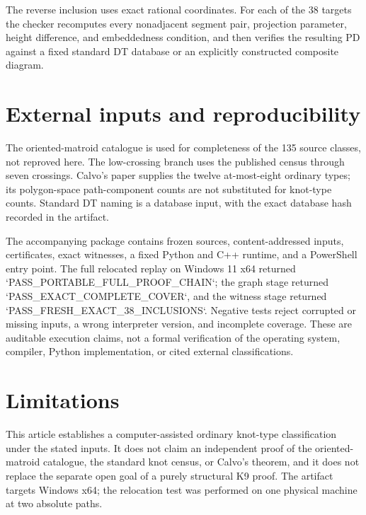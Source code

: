 \documentclass[11pt]{article}
\begin{document}
The reverse inclusion uses exact rational coordinates. For each of the 38 targets the checker recomputes every nonadjacent segment pair, projection parameter, height difference, and embeddedness condition, and then verifies the resulting PD against a fixed standard DT database or an explicitly constructed composite diagram.
\section{External inputs and reproducibility}
The oriented-matroid catalogue is used for completeness of the 135 source classes, not reproved here. The low-crossing branch uses the published census through seven crossings. Calvo's paper supplies the twelve at-most-eight ordinary types; its polygon-space path-component counts are not substituted for knot-type counts. Standard DT naming is a database input, with the exact database hash recorded in the artifact.

The accompanying package contains frozen sources, content-addressed inputs, certificates, exact witnesses, a fixed Python and C++ runtime, and a PowerShell entry point. The full relocated replay on Windows 11 x64 returned `PASS_PORTABLE_FULL_PROOF_CHAIN`; the graph stage returned `PASS_EXACT_COMPLETE_COVER`, and the witness stage returned `PASS_FRESH_EXACT_38_INCLUSIONS`. Negative tests reject corrupted or missing inputs, a wrong interpreter version, and incomplete coverage. These are auditable execution claims, not a formal verification of the operating system, compiler, Python implementation, or cited external classifications.
\section{Limitations}
This article establishes a computer-assisted ordinary knot-type classification under the stated inputs. It does not claim an independent proof of the oriented-matroid catalogue, the standard knot census, or Calvo's theorem, and it does not replace the separate open goal of a purely structural K9 proof. The artifact targets Windows x64; the relocation test was performed on one physical machine at two absolute paths.
\nocite{calvo1999,finschi,menasco2019}

\end{document}
